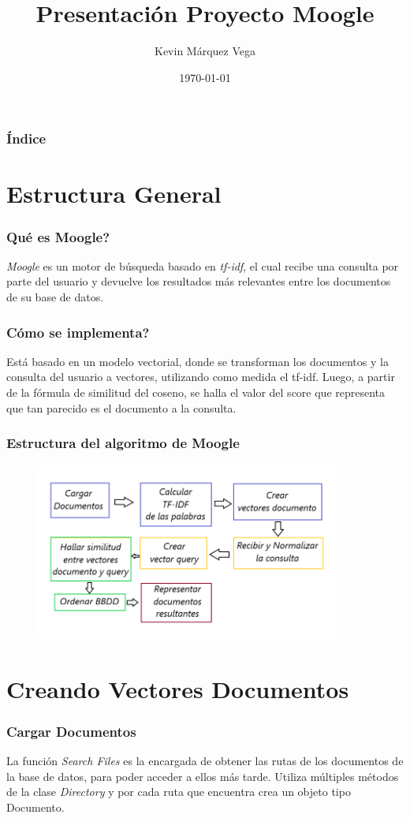 \documentclass{beamer}
\title{Presentación Proyecto Moogle}
\author{Kevin Márquez Vega}
\institute{Universidad de La Habana}
\date{\today}
\begin{document}
\frame{\titlepage}

\begin{frame}
    \frametitle{Índice}
    \tableofcontents
\end{frame}

\section{Estructura General}

\begin{frame}
    \frametitle{Qué es Moogle?}
    \textit{Moogle} es un motor de búsqueda basado en \textit{tf-idf}, el cual recibe una consulta por parte del usuario 
    y devuelve los resultados más relevantes entre los documentos de su base de datos.
\end{frame}

\begin{frame}
    \frametitle{Cómo se implementa?}
    Está basado en un modelo vectorial, donde se transforman los documentos y la consulta del usuario a vectores, utilizando
    como medida el tf-idf. Luego, a partir de la fórmula de similitud del coseno, se halla el valor del score que representa
    que tan parecido es el documento a la consulta.
\end{frame}


\begin{frame}
    \frametitle{Estructura del algoritmo de Moogle}
    \begin{figure}
        \includegraphics[width = 10cm]{./../images/struct.png}
    \end{figure}
\end{frame}

\section{Creando Vectores Documentos}

\begin{frame}
    \frametitle{Cargar Documentos}

    La función \textit{Search Files} es la encargada de obtener las rutas de los documentos de la base de datos, para poder acceder
    a ellos más tarde. Utiliza múltiples métodos de la clase \textit{Directory} y por cada ruta que encuentra crea un objeto tipo Documento.        
\end{frame}
\end{document}

